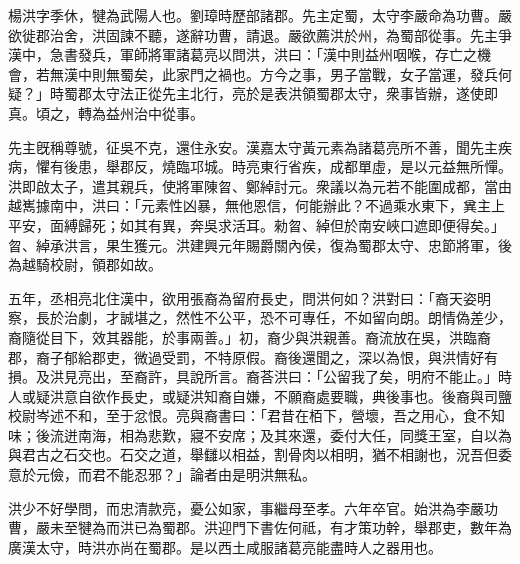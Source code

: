 \begin{pinyinscope}
 
 
 楊洪字季休，犍為武陽人也。劉璋時歷部諸郡。先主定蜀，太守李嚴命為功曹。嚴欲徙郡治舍，洪固諫不聽，遂辭功曹，請退。嚴欲薦洪於州，為蜀部從事。先主爭漢中，急書發兵，軍師將軍諸葛亮以問洪，洪曰：「漢中則益州咽喉，存亡之機會，若無漢中則無蜀矣，此家門之禍也。方今之事，男子當戰，女子當運，發兵何疑？」時蜀郡太守法正從先主北行，亮於是表洪領蜀郡太守，衆事皆辦，遂使即真。頃之，轉為益州治中從事。
 
 
 
 
 先主旣稱尊號，征吳不克，還住永安。漢嘉太守黃元素為諸葛亮所不善，聞先主疾病，懼有後患，舉郡反，燒臨邛城。時亮東行省疾，成都單虛，是以元益無所憚。洪即啟太子，遣其親兵，使將軍陳曶、鄭綽討元。衆議以為元若不能圍成都，當由越嶲據南中，洪曰：「元素性凶暴，無他恩信，何能辦此？不過乘水東下，兾主上平安，面縛歸死；如其有異，奔吳求活耳。勑曶、綽但於南安峽口遮即便得矣。」曶、綽承洪言，果生獲元。洪建興元年賜爵關內侯，復為蜀郡太守、忠節將軍，後為越騎校尉，領郡如故。
 
 
 
 
 五年，丞相亮北住漢中，欲用張裔為留府長史，問洪何如？洪對曰：「裔天姿明察，長於治劇，才誠堪之，然性不公平，恐不可專任，不如留向朗。朗情偽差少，裔隨從目下，效其器能，於事兩善。」初，裔少與洪親善。裔流放在吳，洪臨裔郡，裔子郁給郡吏，微過受罰，不特原假。裔後還聞之，深以為恨，與洪情好有損。及洪見亮出，至裔許，具說所言。裔荅洪曰：「公留我了矣，明府不能止。」時人或疑洪意自欲作長史，或疑洪知裔自嫌，不願裔處要職，典後事也。後裔與司鹽校尉岑述不和，至于忿恨。亮與裔書曰：「君昔在栢下，營壞，吾之用心，食不知味；後流迸南海，相為悲歎，寢不安席；及其來還，委付大任，同獎王室，自以為與君古之石交也。石交之道，舉讎以相益，割骨肉以相明，猶不相謝也，況吾但委意於元儉，而君不能忍邪？」論者由是明洪無私。
 
 
 
 
 洪少不好學問，而忠清款亮，憂公如家，事繼母至孝。六年卒官。始洪為李嚴功曹，嚴未至犍為而洪已為蜀郡。洪迎門下書佐何祗，有才策功幹，舉郡吏，數年為廣漢太守，時洪亦尚在蜀郡。是以西土咸服諸葛亮能盡時人之器用也。
 
 
 
 
\end{pinyinscope}